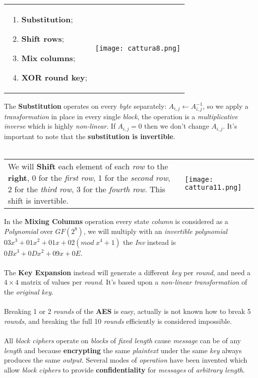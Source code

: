 \documentclass{article}
\begin{document}
\begin{tabular}{C{9cm}  L{10.5cm}}
\begin{enumerate}
\item \textbf{Substitution};
\item \textbf{Shift rows};
\item \textbf{Mix columns};
\item \textbf{XOR round key};
\end{enumerate} &
\texttt{[image: cattura8.png]}
\end{tabular}
The \textbf{Substitution} operates on every \emph{byte} separately: $A_{i,j} \leftarrow A_{i,j}^{-1}$, so we apply a \emph{transformation} in place in every single \emph{block}, the operation is a \emph{multiplicative inverse} which is highly \emph{non-linear}. If $A_{i,j} = 0$ then we don't change $A_{i,j}$. It's important to note that the \textbf{substitution is invertible}.
\\\\
\begin{tabular}{C{9cm}  L{10.5cm}}
We will \textbf{Shift} each element of each \emph{row} to the \textbf{right}, 0 for the \emph{first row}, 1 for the \emph{second row}, 2 for the \emph{third row}, 3 for the \emph{fourth row}. This shift is invertible. 
  & 
  \texttt{[image: cattura11.png]}
\end{tabular}
In the \textbf{Mixing Columns} operation every state \emph{column} is considered as a \emph{Polynomial} over $GF(2^8)$, we will multiply with an \emph{invertible polynomial} $03 x^3+ 01x^2+01x+02(mod\; x^4 +1)$ the \emph{Inv} instead is $0B x^3 + 0D x^2+ 09x+0E$. \\\\
The \textbf{Key Expansion} instead will generate a different \emph{key} per \emph{round}, and need a $4\times4$ matrix of values per \emph{round}. It's based upon a \emph{non-linear transformation} of the \emph{original key}.\\\\
Breaking 1 or 2 \emph{rounds} of the \textbf{AES} is easy, actually is not known how to break 5 \emph{rounds}, and breaking the full 10 \emph{rounds} efficiently is considered impossible. \\\\
All \emph{block ciphers} operate on \emph{blocks} of \emph{fixed length} cause \emph{message} can be of any \emph{length} and because \textbf{encrypting} the same \emph{plaintext} under the same \emph{key} always produces the same \emph{output}. Several modes of \emph{operation} have been invented which allow \emph{block ciphers} to provide \textbf{confidentiality} for \emph{messages} of \emph{arbitrary length}. 
\end{document}
